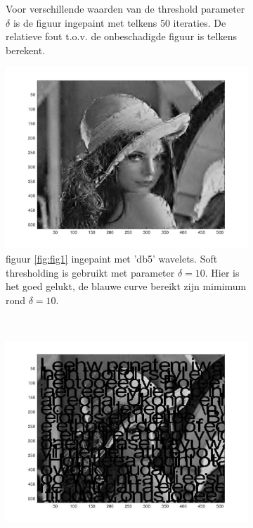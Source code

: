 \begin{figure}
\begin{subfigure}[b]{0.45\textwidth}
        \caption{Voor verschillende waarden van de threshold parameter $\delta$ is de figuur ingepaint met telkens $50$ iteraties. De relatieve fout t.o.v. de onbeschadigde figuur is telkens berekent.}
        \label{fig:mouse}
    \end{subfigure}
      \begin{subfigure}[b]{0.45\textwidth}
        \includegraphics[width=\textwidth]{../src/inpainting/soft_succeed}
        \caption{figuur \ref{fig:fig1} ingepaint met 'db5' wavelets. Soft thresholding is gebruikt met parameter $\delta = 10$. Hier is het goed gelukt, de blauwe curve bereikt zijn mimimum rond $\delta = 10$. \\}
        \label{fig:tiger}
    \end{subfigure}
    ~ %
    \begin{subfigure}[b]{0.45\textwidth}
        \includegraphics[width=\textwidth]{../src/inpainting/hard_fail}

\end{subfigure}
\end{figure}
